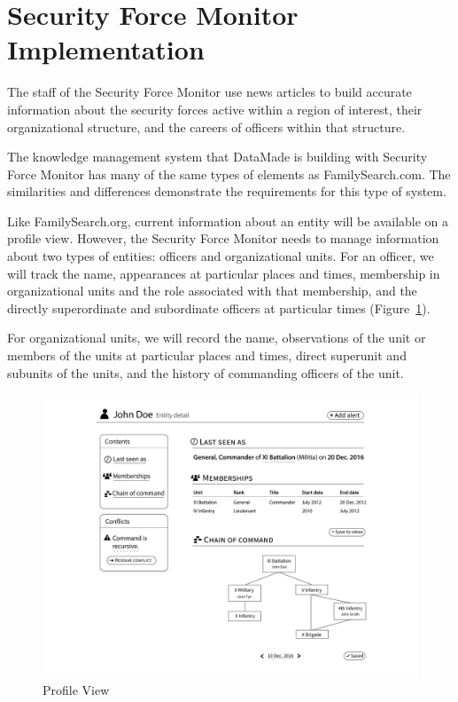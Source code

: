 \documentclass[format=siggraph, review=true]{acmart}
\begin{document}
\section{Security Force Monitor Implementation}
The staff of the Security Force Monitor use news articles to build
accurate information about the security forces active within a region
of interest, their organizational structure, and the careers of
officers within that structure.

The knowledge management system that DataMade is building with
Security Force Monitor has many of the same types of elements as
FamilySearch.com. The similarities and differences demonstrate the
requirements for this type of system.

Like FamilySearch.org, current information about an entity will be
available on a profile view. However, the Security Force Monitor needs to
manage information about two types of entities: officers and
organizational units. For an officer, we will track the name,
appearances at particular places and times, membership in
organizational units and the role associated with that membership, and
the directly superordinate and subordinate officers at particular
times (Figure~\ref{fig:entity-detail}).

For organizational units, we will record the name, observations of the
unit or members of the units at particular places and times, direct
superunit and subunits of the units, and the history of commanding
officers of the unit.

\begin{figure}[h]
\includegraphics[width=\columnwidth]{images/sketches/entity-detail.png}
\caption{Profile View}
\label{fig:entity-detail}
\end{figure}
\end{document}

